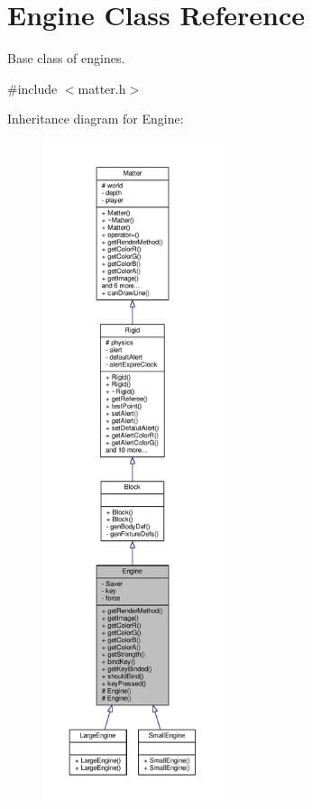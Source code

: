 \hypertarget{classEngine}{}\section{Engine Class Reference}
\label{classEngine}


Base class of engines.  




{\ttfamily \#include $<$matter.\+h$>$}



Inheritance diagram for Engine\+:
\nopagebreak
\begin{figure}[H]
\begin{center}
\leavevmode
\includegraphics[height=550pt]{classEngine__inherit__graph}
\end{center}
\end{figure}


